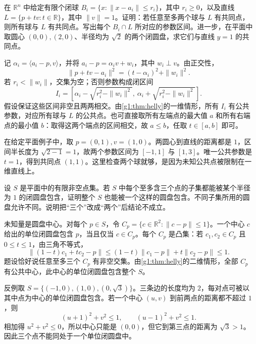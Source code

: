 \begin{exercise}\label{g1:ex:helly-on-line}
	在 \(\mathbb R^n\) 中给定有限个闭球 \(B_i=\{x:\|x-a_i\|\le r_i\}\)，其中 \(r_i\ge0\)，以及直线 \(L=\{p+tv:t\in\mathbb R\}\)，其中 \(\|v\|=1\)。证明：若任意至多两个球与 \(L\) 有共同点，则所有球与 \(L\) 有共同点。写出每个 \(B_i\cap L\) 所对应的参数区间。进一步，在平面中取圆心 \((0,0),(2,0)\)、半径均为 \(\sqrt2\) 的两个闭圆盘，求它们与直线 \(y=1\) 的共同点。
\end{exercise}
\begin{solution}
	记 \(\alpha_i=\langle a_i-p,v\rangle\)，并将 \(a_i-p=\alpha_i v+w_i\)，其中 \(w_i\perp v\)。由正交性，
	\[
		\|p+tv-a_i\|^2=(t-\alpha_i)^2+\|w_i\|^2.
	\]
	若 \(r_i<\|w_i\|\)，交集为空；否则参数构成闭区间
	\[
		I_i=\left[\alpha_i-\sqrt{r_i^2-\|w_i\|^2},\ \alpha_i+\sqrt{r_i^2-\|w_i\|^2}\right].
	\]
	假设保证这些区间非空且两两相交。由\cref{g1:thm:helly}的一维情形，所有 \(I_i\) 有公共参数，对应所有球与 \(L\) 的公共点。也可直接取所有左端点的最大值 \(a\) 和所有右端点的最小值 \(b\)：取得这两个端点的区间相交，故 \(a\le b\)，任取 \(t\in[a,b]\) 即可。

	在给定平面例子中，取 \(p=(0,1),v=(1,0)\)。两圆心到直线的距离都是 \(1\)，区间半长度为 \(\sqrt{2-1}=1\)，故两个参数区间为 \([-1,1]\) 与 \([1,3]\)。唯一公共参数是 \(t=1\)，得到共同点 \((1,1)\)。这里检查两个球就够，是因为未知公共点被限制在一维直线上。
\end{solution}

\begin{exercise}\label{g1:ex:helly-disk-cover}
	设 \(S\) 是平面中的有限非空点集。若 \(S\) 中每个至多含三个点的子集都能被某个半径为 \(1\) 的闭圆盘包含，证明整个 \(S\) 也能被一个这样的圆盘包含。不同子集所用的圆盘允许不同。说明把“三个”改成“两个”后结论不成立。
\end{exercise}
\begin{solution}
	未知量是圆盘中心。对每个 \(p\in S\)，令 \(C_p=\{c\in\mathbb R^2:\|c-p\|\le1\}\)。一个中心 \(c\) 给出的单位闭圆盘包含 \(p\)，当且仅当 \(c\in C_p\)。每个 \(C_p\) 是凸集：若 \(c_1,c_2\in C_p\) 且 \(0\le t\le1\)，由三角不等式，
	\[
		\|(1-t)c_1+tc_2-p\|\le(1-t)\|c_1-p\|+t\|c_2-p\|\le1.
	\]
	题设恰好说任意至多三个 \(C_p\) 有非空交集。由\cref{g1:thm:helly}的二维情形，全部 \(C_p\) 有公共中心，此中心的单位闭圆盘包含整个 \(S\)。

	反例取 \(S=\{(-1,0),(1,0),(0,\sqrt3)\}\)。三条边的长度均为 \(2\)，每对点可被以其中点为中心的单位闭圆盘包含。若一个中心 \((u,v)\) 到前两点的距离都不超过 \(1\)，则
	\[
		(u+1)^2+v^2\le1,\qquad (u-1)^2+v^2\le1.
	\]
	相加得 \(u^2+v^2\le0\)，所以中心只能是 \((0,0)\)，但它到第三点的距离为 \(\sqrt3>1\)。因此三个点不能同处于一个单位闭圆盘中。
\end{solution}

